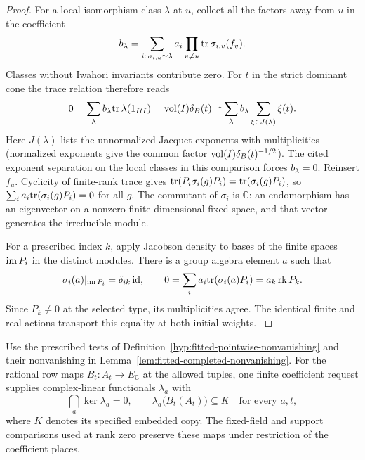 \begin{proof}
For a local isomorphism class \(\lambda\) at \(u\), collect all
the factors away from \(u\) in the coefficient
\[
 b_\lambda=\sum_{i:\,\sigma_{i,u}\simeq\lambda}
             a_i\prod_{v\ne u}{\rm tr}\,\sigma_{i,v}(f_v).
\]
Classes without Iwahori invariants contribute zero. For \(t\) in
the strict dominant cone the trace relation therefore reads
\[
 0=\sum_\lambda b_\lambda{\rm tr}\,\lambda(1_{ItI})
   ={\rm vol}(I)\delta_B(t)^{-1}
       \sum_\lambda b_\lambda\sum_{\xi\in J(\lambda)}\xi(t).
\]
Here \(J(\lambda)\) lists the unnormalized Jacquet exponents with
multiplicities (normalized exponents give the common factor
\({\rm vol}(I)\delta_B(t)^{-1/2}\)). The cited exponent separation
on the local classes in this comparison forces \(b_\lambda=0\).
Reinsert \(f_u\). Cyclicity of finite-rank trace gives
\({\rm tr}(P_i\sigma_i(g)P_i)={\rm tr}(\sigma_i(g)P_i)\),
so \(\sum_i a_i{\rm tr}(\sigma_i(g)P_i)=0\) for all \(g\).
\cite{zelevinsky-induction}\label{cor:automorphic-realization-9}
The commutant of \(\sigma_i\) is \(\mathbb C\): an endomorphism
has an eigenvector on a nonzero finite-dimensional fixed space,
and that vector generates the irreducible module.

For a prescribed
index \(k\), apply Jacobson density to bases of the finite spaces
\({\rm im}\,P_i\) in the distinct modules. There is a group
algebra element \(a\) such that
\[
 \sigma_i(a)|_{{\rm im}\,P_i}=\delta_{ik}\,{\rm id},\qquad
 0=\sum_i a_i{\rm tr}(\sigma_i(a)P_i)=a_k\operatorname{rk}P_k .
\]
Since \(P_k\ne0\) at the selected type, its multiplicities agree.
The identical finite and real actions transport this equality at
both initial weights. \label{cor:automorphic-realization-10}
\end{proof}

\begin{lemma}\label{lem:rational-row-separation}
Use the prescribed tests of Definition~\ref{hyp:fitted-pointwise-nonvanishing} and their nonvanishing in Lemma~\ref{lem:fitted-completed-nonvanishing}. For the rational row maps \(B_t:A_t\to E_{\mathbb C}\) at the allowed tuples, one finite coefficient request supplies complex-linear functionals \(\lambda_a\) with
\[
 \bigcap_a\ker\lambda_a=0,\qquad\lambda_a\bigl(B_t(A_t)\bigr)\subseteq K\quad\text{for every }a,t,
\]
where \(K\) denotes its specified embedded copy.
The fixed-field and support comparisons used at rank zero
preserve these maps under restriction of the coefficient
places.
\end{lemma}

